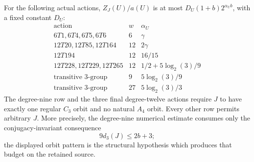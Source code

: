 \begin{lemma}\label{lem:c1-earlier-fibres}
For the following actual actions, $Z_J(U)/a(U)$ is at most
$D_U(1+b)2^{\alpha_U b}$, with a fixed constant $D_U$:
\[
\begin{array}{c|c|c}
 \text{action}&w&\alpha_U\\\hline
 6T1,6T4,6T5,6T6&6&\gamma\\
 12T20,12T85,12T164&12&2\gamma\\
 12T194&12&16/15\\
 12T228,12T229,12T265&12&1/2+5\log_2(3)/9\\
 \text{transitive }3\text{-group}&9&5\log_2(3)/9\\
 \text{transitive }3\text{-group}&27&5\log_2(3)/3
\end{array}
\]
The degree-nine row and the three final degree-twelve actions require
$J$ to have exactly one regular $C_3$ orbit and no natural $A_4$
orbit. Every other row permits arbitrary $J$.
More precisely, the degree-nine numerical estimate consumes only the
conjugacy-invariant consequence
\[
  9d_3(J)\leq 2b+3;
\]
the displayed orbit pattern is the structural hypothesis which produces
that budget on the retained source.
\end{lemma}
